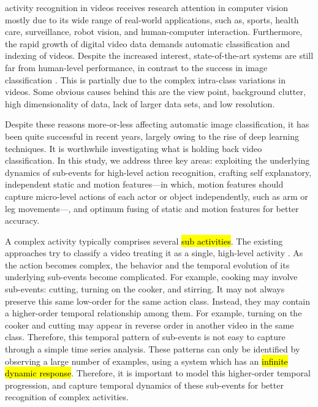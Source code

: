   
 activity recognition in videos receives research attention
in computer vision mostly due to its wide range of real-world applications, such as,
sports, health care, surveillance, robot vision, and human-computer interaction.
Furthermore, the rapid growth of digital video data demands automatic
classification and indexing of videos. Despite the increased interest, state-of-the-art
systems are still far from human-level performance, in contrast to the success in image classification \cite{girshick2014rich, krizhevsky2012imagenet}. This is partially due to the complex intra-class variations in videos. Some
obvious causes behind this are the view point, background
clutter, high dimensionality of data, lack of larger data sets, and low resolution.

Despite these reasons more-or-less affecting automatic image classification, it has been quite successful in recent years,
largely owing to the rise of deep learning techniques. It is worthwhile investigating
what is holding back video classification. In this study, we address three key
areas: exploiting the underlying dynamics of sub-events for high-level action recognition, crafting
self explanatory, independent static and motion features---in which, motion features should capture micro-level actions
of each actor or object independently, such as arm or leg movements---, and optimum fusing of static and motion features for better accuracy.

A complex activity typically comprises several \hl{sub activities}.
The existing approaches try to classify a video treating it as a
single, high-level activity \cite{wang2011action, wang2013action, simonyan2014two, 7486474}.
As the action becomes complex, the behavior and the
temporal evolution of its underlying sub-events become complicated. For example,
cooking may involve sub-events: cutting, turning on the cooker, and stirring. It may not always preserve this
same low-order for the same action class. Instead, they may contain
a higher-order temporal relationship among them. For example, turning on the cooker and cutting
may appear in reverse order in another video in the same class.
Therefore, this temporal pattern of sub-events is not easy to capture through a simple
time series analysis. These patterns can only be identified by observing a large number
of examples, using a system which has an \hl{infinite dynamic response}. Therefore, it is important to
model this higher-order temporal
progression, and capture temporal dynamics of these sub-events for better recognition of
complex activities.


